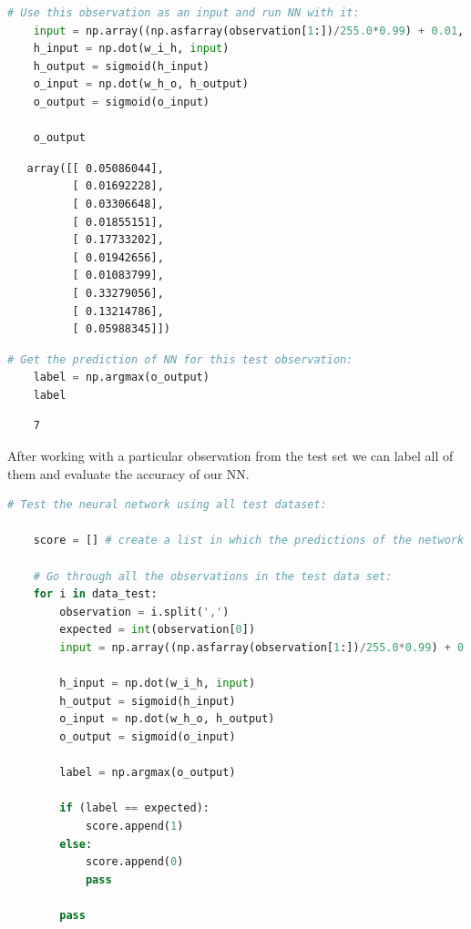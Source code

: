 \begin{lstlisting}[language=Python]
    # Use this observation as an input and run NN with it:
    input = np.array((np.asfarray(observation[1:])/255.0*0.99) + 0.01, ndmin=2).T
    h_input = np.dot(w_i_h, input)
    h_output = sigmoid(h_input)
    o_input = np.dot(w_h_o, h_output)
    o_output = sigmoid(o_input)
    
    o_output
\end{lstlisting}

\begin{lstlisting}
   array([[ 0.05086044],
          [ 0.01692228],
          [ 0.03306648],
          [ 0.01855151],
          [ 0.17733202],
          [ 0.01942656],
          [ 0.01083799],
          [ 0.33279056],
          [ 0.13214786],
          [ 0.05988345]])
\end{lstlisting}

\begin{lstlisting}[language=Python]
    # Get the prediction of NN for this test observation:
    label = np.argmax(o_output)
    label
\end{lstlisting}

\begin{lstlisting}
    7
\end{lstlisting}

After working with a particular observation from the test set we can label all of them and evaluate the accuracy of our NN.

\begin{lstlisting}[language=Python]   
    # Test the neural network using all test dataset:
    
    score = [] # create a list in which the predictions of the network will we saved.
    
    # Go through all the observations in the test data set:
    for i in data_test:
        observation = i.split(',')
        expected = int(observation[0])
        input = np.array((np.asfarray(observation[1:])/255.0*0.99) + 0.01, ndmin=2).T
    
        h_input = np.dot(w_i_h, input)
        h_output = sigmoid(h_input)
        o_input = np.dot(w_h_o, h_output)
        o_output = sigmoid(o_input)
    
        label = np.argmax(o_output)
    
        if (label == expected):
            score.append(1)
        else:
            score.append(0)
            pass
        
        pass
\end{lstlisting}

